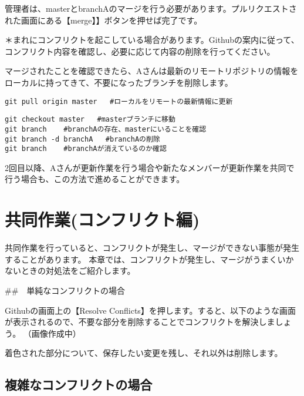 \documentclass[
]{book}
\begin{document}
管理者は、masterとbranchAのマージを行う必要があります。プルリクエストされた画面にある【merge】】ボタンを押せば完了です。

＊まれにコンフリクトを起こしている場合があります。Githubの案内に従って、コンフリクト内容を確認し、必要に応じて内容の削除を行ってください。

マージされたことを確認できたら、Aさんは最新のリモートリポジトリの情報をローカルに持ってきて、不要になったブランチを削除します。

\begin{verbatim}
git pull origin master   #ローカルをリモートの最新情報に更新
\end{verbatim}

\begin{verbatim}
git checkout master   #masterブランチに移動
git branch    #branchAの存在、masterにいることを確認
git branch -d branchA   #branchAの削除
git branch    #branchAが消えているのか確認
\end{verbatim}

2回目以降、Aさんが更新作業を行う場合や新たなメンバーが更新作業を共同で行う場合も、この方法で進めることができます。

\hypertarget{ux5171ux540cux4f5cux696dux30b3ux30f3ux30d5ux30eaux30afux30c8ux7de8}{%
\chapter{共同作業(コンフリクト編)}\label{ux5171ux540cux4f5cux696dux30b3ux30f3ux30d5ux30eaux30afux30c8ux7de8}}

共同作業を行っていると、コンフリクトが発生し、マージができない事態が発生することがあります。
本章では、コンフリクトが発生し、マージがうまくいかないときの対処法をご紹介します。

\#\#　単純なコンフリクトの場合

Githubの画面上の【Resolve Conflicts】を押します。すると、以下のような画面が表示されるので、不要な部分を削除することでコンフリクトを解決しましょう。
（画像作成中）

着色された部分について、保存したい変更を残し、それ以外は削除します。

\hypertarget{ux8907ux96d1ux306aux30b3ux30f3ux30d5ux30eaux30afux30c8ux306eux5834ux5408}{%
\section{複雑なコンフリクトの場合}\label{ux8907ux96d1ux306aux30b3ux30f3ux30d5ux30eaux30afux30c8ux306eux5834ux5408}}
\end{document}
